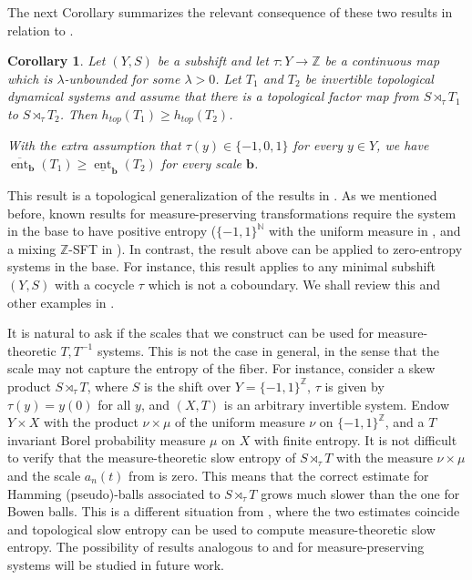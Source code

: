 \documentclass[a4paper,oneside]{amsart}
\renewcommand{\(}{\begin{dmath*}}
\renewcommand{\)}{\end{dmath*}}
\newtheorem{corollary}[theorem]{Corollary}
\theoremstyle{definition}
\newcommand{\N}{\mathbb{N}}
\newcommand{\Z}{\mathbb{Z}}
\newcommand{\upperent}{\overline{\operatorname{ent}}}
\newcommand{\lowerent}{\underline{\operatorname{ent}}}
\begin{document}
The next Corollary summarizes the relevant consequence of these two results in relation to .
\begin{corollary}\label{corollary}
    Let $(Y,S)$ be a subshift and let $\tau\colon Y\to \Z$ be a continuous map which is $\lambda$-unbounded for some $\lambda>0$. Let $T_1$ and $T_2$ be invertible topological dynamical systems and assume that there is a topological factor map from $S\rtimes_\tau T_1$ to $S\rtimes_\tau T_2$. Then $h_{top}(T_1)\geq h_{top}(T_2)$. 

    With the extra assumption that $\tau(y)\in \{-1,0,1\}$ for every $y\in Y$, we have $\upperent_{\textbf{b}}(T_1)\geq \lowerent_{\textbf{b}}(T_2)$ for every scale $\textbf{b}$.  
\end{corollary}
This result is a topological generalization of the results in \cite{
heicklen_entropy_2000,ball_entropy_2003,austin_scenery_2014}. As we mentioned before, known results for measure-preserving transformations require the system in the base to have positive entropy ($\{-1,1\}^\N$ with the uniform measure in \cite{
heicklen_entropy_2000,ball_entropy_2003}, and a mixing $\Z$-SFT in \cite{austin_scenery_2014}). In contrast, the result above can be applied to zero-entropy systems in the base. For instance, this result applies to any minimal subshift $(Y,S)$ with a cocycle $\tau$ which is not a coboundary.  We shall review this and other examples in . 


It is natural to ask  if the scales that we construct can be used for measure-theoretic $T,T^{-1}$ systems. This is not the case in general, in the sense that the scale may not capture the entropy of the fiber. For instance, consider a skew product $S\rtimes_\tau T$, where $S$ is the shift over $Y=\{-1,1\}^\Z$, $\tau$ is given by $\tau(y)=y(0)$ for all $y$, and $(X,T)$ is an arbitrary invertible system. Endow $Y\times X$ with the product $\nu\times \mu$ of the uniform measure $\nu$ on $\{-1,1\}^\Z$, and a $T$ invariant Borel probability measure $\mu$ on $X$ with finite entropy. It is not difficult to verify that the measure-theoretic slow entropy of $S\rtimes_\tau T$ with the measure $\nu\times\mu$ and the scale $a_n(t)$ from  is zero. This means that the correct estimate for Hamming (pseudo)-balls associated to $S\rtimes_\tau T$ grows much slower than the one for Bowen balls. This is a different situation from \cite{kanigowski_slow_2019,kanigowski_slow_2018,kanigowski_slow_2022}, where the two estimates coincide and topological slow entropy can be used to compute measure-theoretic slow entropy. The possibility of results analogous to  and  for measure-preserving systems will be studied in future work. 
\end{document}
